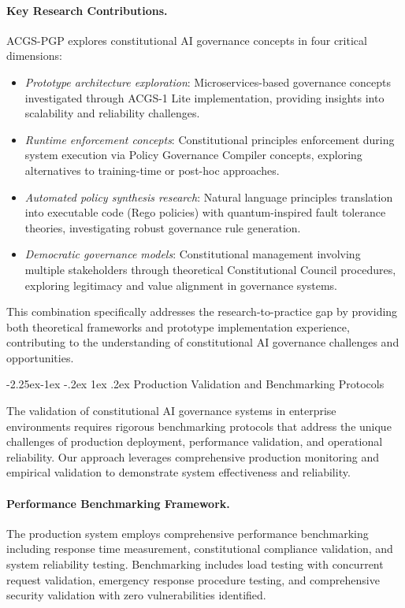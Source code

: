 \documentclass[manuscript,screen,9pt]{acmart}
\makeatletter
\renewcommand\subsection{\@startsection{subsection}{2}{\z@}%
  {-2.25ex\@plus -1ex \@minus -.2ex}%
  {1ex \@plus .2ex}%
  {\normalfont\large\bfseries}}
\makeatother
\begin{document}
\paragraph{Key Research Contributions.} ACGS-PGP explores constitutional AI governance concepts in four critical dimensions:
\begin{itemize}[leftmargin=*,itemsep=1pt,parsep=1pt]
    \item \textit{Prototype architecture exploration}: Microservices-based governance concepts investigated through ACGS-1 Lite implementation, providing insights into scalability and reliability challenges.
    \item \textit{Runtime enforcement concepts}: Constitutional principles enforcement during system execution via Policy Governance Compiler concepts, exploring alternatives to training-time or post-hoc approaches.
    \item \textit{Automated policy synthesis research}: Natural language principles translation into executable code (Rego policies) with quantum-inspired fault tolerance theories, investigating robust governance rule generation.
    \item \textit{Democratic governance models}: Constitutional management involving multiple stakeholders through theoretical Constitutional Council procedures, exploring legitimacy and value alignment in governance systems.
\end{itemize}
This combination specifically addresses the research-to-practice gap by providing both theoretical frameworks and prototype implementation experience, contributing to the understanding of constitutional AI governance challenges and opportunities.

\subsection{Production Validation and Benchmarking Protocols}
\label{subsec:production_benchmarking}

The validation of constitutional AI governance systems in enterprise environments requires rigorous benchmarking protocols that address the unique challenges of production deployment, performance validation, and operational reliability. Our approach leverages comprehensive production monitoring and empirical validation to demonstrate system effectiveness and reliability.

\paragraph{Performance Benchmarking Framework.} The production system employs comprehensive performance benchmarking including response time measurement, constitutional compliance validation, and system reliability testing. Benchmarking includes load testing with concurrent request validation, emergency response procedure testing, and comprehensive security validation with zero vulnerabilities identified.
\end{document}
